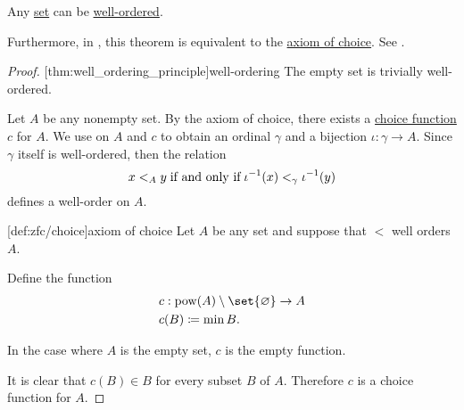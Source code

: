 \begin{theorem}\label{thm:well_ordering_principle}
  Any \hyperref[def:set]{set} can be \hyperref[def:well_ordered_set]{well-ordered}.

  Furthermore, in \hyperref[def:zfc]{}, this theorem is equivalent to the \hyperref[def:zfc/choice]{axiom of choice}. See .
\end{theorem}
\begin{proof}
  [thm:well_ordering_principle]{well-ordering} The empty set is trivially well-ordered.

  Let \( A \) be any nonempty set. By the axiom of choice, there exists a \hyperref[def:choice_function]{choice function} \( c \) for \( A \). We use  on \( A \) and \( c \) to obtain an ordinal \( \gamma \) and a bijection \( \iota: \gamma \to A \). Since \( \gamma \) itself is well-ordered, then the relation
  \begin{equation*}
    x <_A y \T{if and only if} \iota^{-1}(x) <_\gamma \iota^{-1}(y)
  \end{equation*}
  defines a well-order on \( A \).

  [def:zfc/choice]{axiom of choice} Let \( A \) be any set and suppose that \( < \) well orders \( A \).

  Define the function
  \begin{equation*}
    \begin{aligned}
      &c: \pow(A) \setminus \set{ \varnothing } \to A \\
      &c(B) \coloneqq \min B.
    \end{aligned}
  \end{equation*}

  In the case where \( A \) is the empty set, \( c \) is the empty function.

  It is clear that \( c(B) \in B \) for every subset \( B \) of \( A \). Therefore \( c \) is a choice function for \( A \).
\end{proof}


